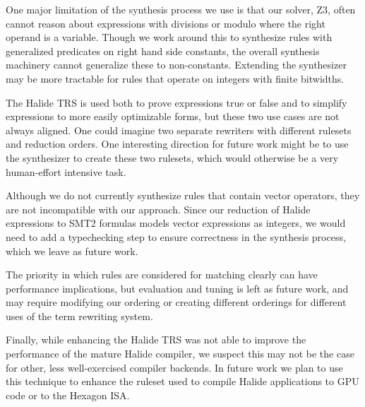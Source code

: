 \documentclass[acmsmall]{acmart}\settopmatter{}
\begin{document}
One major limitation of the synthesis process we use is that our solver,
Z3, often cannot reason about expressions with divisions or modulo
where the right operand is a variable.  Though we work around this to
synthesize rules with generalized predicates on right hand side constants,
the overall synthesis machinery cannot generalize these to non-constants.
Extending the synthesizer may be more tractable for rules that operate
on integers with finite bitwidths.

The Halide TRS is used both to prove expressions true or false and to
simplify expressions to more easily optimizable forms, but these two use cases
are not always aligned. One could imagine two separate rewriters with
different rulesets and reduction orders. One interesting direction for future
work might be to use the synthesizer to create these two rulesets, which would
otherwise be a very human-effort intensive task.

Although we do not currently synthesize rules that contain vector operators,
they are not incompatible with our approach. Since our reduction of Halide
expressions to SMT2 formulas models vector expressions as integers, we would need
to add a typechecking step to ensure correctness in the synthesis process, which
we leave as future work.

The priority in which rules are considered for matching clearly can have
performance implications, but evaluation and tuning is left as future work, and
may require modifying our ordering or creating different orderings for different
uses of the term rewriting system.

Finally, while enhancing the Halide TRS was not able to improve the performance of the mature Halide compiler, we suspect this may not be the case for other, less well-exercised compiler backends. In future work we plan to use this technique to enhance the ruleset used to compile Halide applications to GPU code or to the Hexagon ISA.
\end{document}
